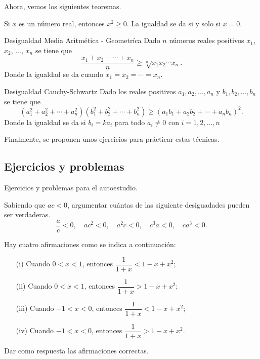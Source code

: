 Ahora, vemos los siguientes teoremas.

\begin{theorem.box}{}{}
    Si $x$ es un número real, entonces $x^2 \geq 0$.
    La igualdad se da si y solo si $x = 0$.
\end{theorem.box}

\begin{theorem.box}{Desigualdad Media Aritmética - Geometríca}{}
    Dado $n$ números reales positivos $x_1$, $x_2$, $\ldots$, $x_n$ se tiene que
    \[
        \dfrac{x_1 + x_2 + \cdots + x_n}{n} \geq \sqrt[n]{x_1 x_2 \cdots x_n}.
    \]
    Donde la igualdad se da cuando $x_1 = x_2 = \cdots = x_n$.
\end{theorem.box}

\begin{theorem.box}{Desigualdad Cauchy-Schwartz}{}
    Dado los reales positivos $a_1, a_2, \ldots, a_n$ y $b_1, b_2, \ldots, b_n$ se tiene que
    \[
        (a_1^2 + a_2^2 + \cdots + a_n^2)(b_1^2 + b_2^2 + \cdots + b_n^2) \geq (a_1 b_1 + a_2 b_2 + \cdots + a_n b_n)^2.
    \]
    Donde la igualdad se da si $b_i = k a_i$ para todo $a_i \neq 0$ con $i = 1, 2, \ldots, n$
\end{theorem.box}

Finalmente, se proponen unos ejercicios para prácticar estas técnicas.



\subsection{Ejercicios y problemas}

Ejercicios y problemas para el autoestudio.

\begin{exercise}
    Sabiendo que $ac < 0$, argumentar cuántas de las siguiente desiguadades pueden ser verdaderas.
    \[
        \frac{a}{c} < 0,\quad ac^2 < 0,\quad a^2 c < 0,\quad c^3 a < 0,\quad ca^3 < 0.
    \]
\end{exercise}

\begin{exercise}
    Hay cuatro afirmaciones como se indica a continuación:
    \begin{itemize}
        \item[(i)] Cuando $0 < x < 1$, entonces $\dfrac{1}{1 + x} < 1 - x + x^2$;
        \item[(ii)] Cuando $0 < x < 1$, entonces $\dfrac{1}{1 + x} > 1 - x + x^2$;
        \item[(iii)] Cuando $-1 < x < 0$, entonces $\dfrac{1}{1 + x} < 1 - x + x^2$;
        \item[(iv)] Cuando $-1 < x < 0$, entonces $\dfrac{1}{1 + x} > 1 - x + x^2$.
    \end{itemize}
    Dar como respuesta las afirmaciones correctas.
\end{exercise}


